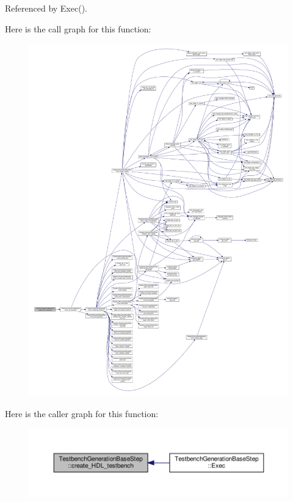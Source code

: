 Referenced by Exec().

Here is the call graph for this function\+:
\nopagebreak
\begin{figure}[H]
\begin{center}
\leavevmode
\includegraphics[width=350pt]{dc/d02/classTestbenchGenerationBaseStep_a8165d4d698bb9c74fbfd781a69fbe768_cgraph}
\end{center}
\end{figure}
Here is the caller graph for this function\+:
\nopagebreak
\begin{figure}[H]
\begin{center}
\leavevmode
\includegraphics[width=350pt]{dc/d02/classTestbenchGenerationBaseStep_a8165d4d698bb9c74fbfd781a69fbe768_icgraph}
\end{center}
\end{figure}
\mbox{\label{classTestbenchGenerationBaseStep_ae3c011333a26f77252e27244cd7f08a9}} 
